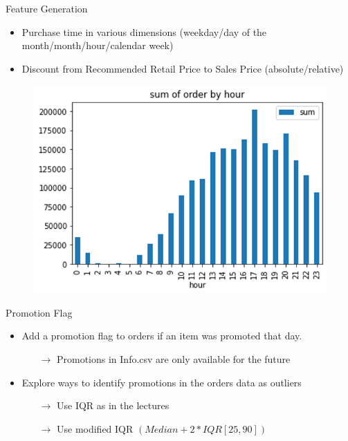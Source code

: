 \documentclass[10pt, xcolor=dvipsnames]{beamer}
\begin{document}
\begin{frame}{Feature Generation}
        \begin{itemize}
	\item Purchase time in various dimensions (weekday/day of the month/month/hour/calendar week)
	\item Discount from Recommended Retail Price to Sales Price (absolute/relative)
        \end{itemize}
\begin{figure}
\includegraphics[width=.7\textwidth]{orderbyhour.png}
\end{figure}
\end{frame}

\begin{frame}{Promotion Flag}
\begin{itemize}
	\item Add a promotion flag to orders if an item was promoted that day.
	\begin{itemize}
	\item[$\rightarrow$] Promotions in Info.csv are only available for the future
	\end{itemize}
	\item Explore ways to identify promotions in the orders data as outliers
	\begin{itemize}
		\item[$\rightarrow$] Use IQR as in the lectures
		\item[$\rightarrow$] Use modified IQR $(Median + 2*IQR[25, 90])$
	\end{itemize}
\end{itemize}
\end{frame}
\end{document}
